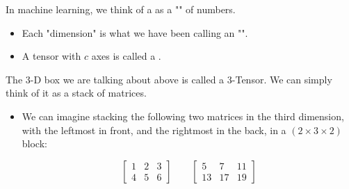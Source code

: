         \begin{definition}
            In machine learning, we think of a  as a "" of numbers.

            \begin{itemize}
                \item Each "dimension" is what we have been calling an "".
                
                \item A tensor with $c$ axes is called a .
            \end{itemize}
            
        \end{definition}
        
        \miniex The 3-D box we are talking about above is called a 3-Tensor. We can simply think of it as a stack of matrices.

        \begin{itemize}
            \item We can imagine stacking the following two matrices in the third dimension, with the leftmost in front, and the rightmost in the back, in a $(2 \times 3 \times 2)$ block:

            \begin{equation}
                \begin{bmatrix}
                    1 & 2  & 3 \\ 4 & 5 & 6
                \end{bmatrix}
                \qquad
                \begin{bmatrix}
                    5 & 7 & 11 \\ 13 & 17 & 19
                \end{bmatrix}
            \end{equation}
        \end{itemize}


